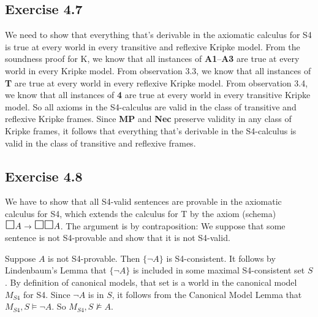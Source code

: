 \documentclass{scrartcl}
\let\oldbox\Box
\renewcommand\Box{\scaleobj{1.2}{\oldbox}}
\let\oldto\to
\renewcommand\to{\scaleobj{0.95}{\,\oldto\,}}
\begin{document}
  \subsection*{Exercise 4.7}

%
%
  We need to show that everything that's derivable in the axiomatic calculus for
  S4 is true at every world in every transitive and reflexive Kripke model. From
  the soundness proof for K, we know that all instances of
  \textbf{A1}--\textbf{A3} are true at every world in every Kripke model. From
  observation 3.3, we know that all instances of \textbf{T} are
  true at every world in every reflexive Kripke model. From observation
  3.4, we know that all instances of \textbf{4} are true at every
  world in every transitive Kripke model. So all axioms in the S4-calculus are
  valid in the class of transitive and reflexive Kripke frames. Since
  \textbf{MP} and \textbf{Nec} preserve validity in any class of Kripke frames,
  it follows that everything that's derivable in the S4-calculus is valid in the
  class of transitive and reflexive frames.

  \subsection*{Exercise 4.8}

%
%
  We have to show that all S4-valid sentences are provable in the axiomatic
  calculus for S4, which extends the calculus for T by the axiom (schema)
  $\Box A \to \Box\Box A$. The argument is by contraposition: We suppose that
  some sentence is not S4-provable and show that it is not S4-valid.

  Suppose $A$ is not S4-provable. Then $\{ \neg A \}$ is S4-consistent. It
  follows by Lindenbaum's Lemma that $\{ \neg A \}$ is included in some maximal
  S4-consistent set $S$. By definition of canonical models, that set is a world
  in the canonical model $M_{S4}$ for S4.  Since $\neg A$ is in $S$, it follows
  from the Canonical Model Lemma that $M_{S4},S \models \neg A$. So
  $M_{S4},S \not\models A$.
\end{document}
